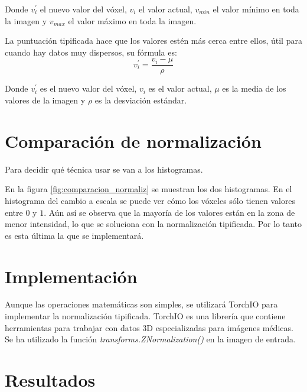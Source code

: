 Donde $v_i^{'}$ el nuevo valor del vóxel, $v_i$ el valor actual, $v_{min}$ el valor mínimo en toda la imagen y $v_{max}$ el valor máximo en toda la imagen.

La puntuación tipificada hace que los valores estén más cerca entre ellos, útil para cuando hay datos muy dispersos, su fórmula es:
\begin{equation}
v_i^{'} = \frac{v_i - \mu}{\rho}
\end{equation}

Donde $v_i^{'}$ es el nuevo valor del vóxel, $v_i$ es el valor actual, $\mu$ es la media de los valores de la imagen y $\rho$ es la desviación estándar. \cite{znormalization}

\section{Comparación de normalización}\label{sec:normalization_compara}

Para decidir qué técnica usar se van a los histogramas.


En la figura \ref{fig:comparacion_normaliz} se muestran los dos histogramas. En el histograma del cambio a escala se puede ver cómo los vóxeles sólo tienen valores entre $0$ y $1$. Aún así se observa que la mayoría de los valores están en la zona de menor intensidad, lo que se soluciona con la normalización tipificada. Por lo tanto es esta última la que se implementará.

\section{Implementación}\label{sec:znormalization_implementation}

Aunque las operaciones matemáticas son simples, se utilizará TorchIO \cite{PerezGarcia2020} para implementar la normalización tipificada. TorchIO es una librería que contiene herramientas para trabajar con datos 3D especializadas para imágenes médicas. Se ha utilizado la función \textit{transforms.ZNormalization()} en la imagen de entrada.

\section{Resultados}\label{sec:apex_resultados}

